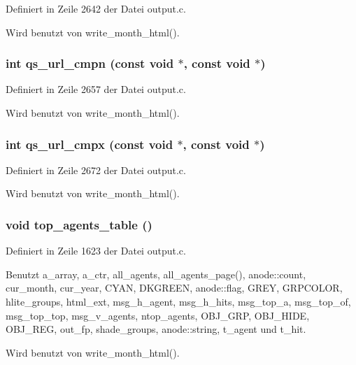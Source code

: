 Definiert in Zeile 2642 der Datei output.c.

Wird benutzt von write\_\-month\_\-html().
\subsubsection{\setlength{\rightskip}{0pt plus 5cm}int qs\_\-url\_\-cmpn (const void $\ast$, const void $\ast$)}\label{output_8c_3b87c7768eed36e84a622e431b378942}




Definiert in Zeile 2657 der Datei output.c.

Wird benutzt von write\_\-month\_\-html().
\subsubsection{\setlength{\rightskip}{0pt plus 5cm}int qs\_\-url\_\-cmpx (const void $\ast$, const void $\ast$)}\label{output_8c_9fb87dcc576463c9ce98593782734d59}




Definiert in Zeile 2672 der Datei output.c.

Wird benutzt von write\_\-month\_\-html().
\subsubsection{\setlength{\rightskip}{0pt plus 5cm}void top\_\-agents\_\-table ()}\label{output_8c_55f5637d81e4b2847ea889ac14cbcc6b}




Definiert in Zeile 1623 der Datei output.c.

Benutzt a\_\-array, a\_\-ctr, all\_\-agents, all\_\-agents\_\-page(), anode::count, cur\_\-month, cur\_\-year, CYAN, DKGREEN, anode::flag, GREY, GRPCOLOR, hlite\_\-groups, html\_\-ext, msg\_\-h\_\-agent, msg\_\-h\_\-hits, msg\_\-top\_\-a, msg\_\-top\_\-of, msg\_\-top\_\-top, msg\_\-v\_\-agents, ntop\_\-agents, OBJ\_\-GRP, OBJ\_\-HIDE, OBJ\_\-REG, out\_\-fp, shade\_\-groups, anode::string, t\_\-agent und t\_\-hit.

Wird benutzt von write\_\-month\_\-html().
